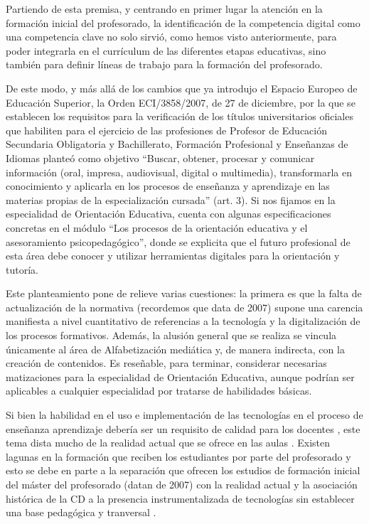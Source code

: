 \documentclass[spanish]{textolivre}
\begin{document}
Partiendo de esta premisa, y centrando en primer lugar la atención en la formación inicial del profesorado, la identificación de la competencia digital como una competencia clave no solo sirvió, como hemos visto anteriormente, para poder integrarla en el currículum de las diferentes etapas educativas, sino también para definir líneas de trabajo para la formación del profesorado.

De este modo, y más allá de los cambios que ya introdujo el Espacio Europeo de Educación Superior, la Orden ECI/3858/2007, de 27 de diciembre, por la que se establecen los requisitos para la verificación de los títulos universitarios oficiales que habiliten para el ejercicio de las profesiones de Profesor de Educación Secundaria Obligatoria y Bachillerato, Formación Profesional y Enseñanzas de Idiomas planteó como objetivo “Buscar, obtener, procesar y comunicar información (oral, impresa, audiovisual, digital o multimedia), transformarla en conocimiento y aplicarla en los procesos de enseñanza y aprendizaje en las materias propias de la especialización cursada” (art. 3). Si nos fijamos en la especialidad de Orientación Educativa, cuenta con algunas especificaciones concretas en el módulo “Los procesos de la orientación educativa y el asesoramiento psicopedagógico”, donde se explicita que el futuro profesional de esta área debe conocer y utilizar herramientas digitales para la orientación y tutoría.

Este planteamiento pone de relieve varias cuestiones: la primera es que la falta de actualización de la normativa (recordemos que data de 2007) supone una carencia manifiesta a nivel cuantitativo de referencias a la tecnología y la digitalización de los procesos formativos. Además, la alusión general que se realiza se vincula únicamente al área de Alfabetización mediática y, de manera indirecta, con la creación de contenidos. Es reseñable, para terminar, considerar necesarias matizaciones para la especialidad de Orientación Educativa, aunque podrían ser aplicables a cualquier especialidad por tratarse de habilidades básicas.

Si bien la habilidad en el uso e implementación de las tecnologías en el proceso de enseñanza aprendizaje debería ser un requisito de calidad para los docentes \cite{castaneda_por_2018}, este tema dista mucho de la realidad actual que se ofrece en las aulas \cite{rodriguez2017formacion}. Existen lagunas en la formación que reciben los estudiantes por parte del profesorado y esto se debe en parte a la separación que ofrecen los estudios de formación inicial del máster del profesorado (datan de 2007) con la realidad actual y la asociación histórica de la CD a la presencia instrumentalizada de tecnologías sin establecer una base pedagógica y tranversal \cite{esteve-mon_competencia_2016}. 
\end{document}
